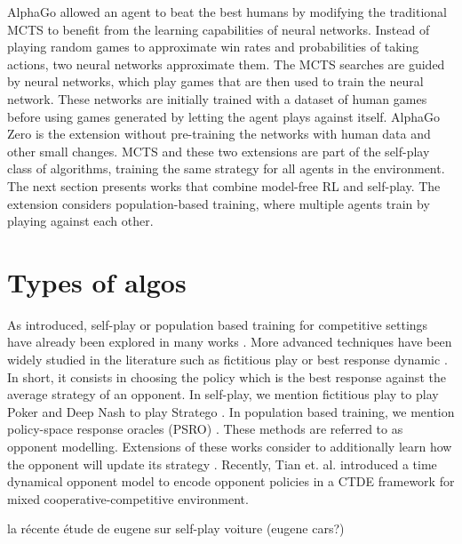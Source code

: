 AlphaGo \citep{silver2016mastering} allowed an agent to beat the best humans by modifying the traditional MCTS to benefit from the learning capabilities of neural networks.
Instead of playing random games to approximate win rates and probabilities of taking actions, two neural networks approximate them.
The MCTS searches are guided by neural networks, which play games that are then used to train the neural network.
These networks are initially trained with a dataset of human games before using games generated by letting the agent plays against itself.
AlphaGo Zero \citep{silver2017mastering} is the extension without pre-training the networks with human data and other small changes.
MCTS and these two extensions are part of the self-play class of algorithms, training the same strategy for all agents in the environment.
The next section presents works that combine model-free RL and self-play.
The extension considers population-based training, where multiple agents train by playing against each other.

\section{Types of algos}\label{sec:ch6_algo}

As introduced, self-play or population based training for competitive settings have already been explored in many works \citep{jaderberg2019human, vinyals2019grandmaster, baker2019emergent}.
More advanced techniques have been widely studied in the literature such as fictitious play \cite{brown1951iterative} or best response dynamic \citep{baudin2022fictitious}.
In short, it consists in choosing the policy which is the best response against the average strategy of an opponent.
In self-play, we mention fictitious play to play Poker \citep{pmlr-v37-heinrich15} and Deep Nash to play Stratego \citep{DM_stratego}.
In population based training, we mention policy-space response oracles (PSRO) \citep{NIPS2017_3323fe11, Muller2020A}.
These methods are referred to as opponent modelling.
Extensions of these works consider to additionally learn how the opponent will update its strategy \citep{he2016opponent, foerster2017learning}.
Recently, Tian et. al. \citep{tian2022multi} introduced a time dynamical opponent model to encode opponent policies in a CTDE framework for mixed cooperative-competitive environment.

la récente étude de eugene sur self-play voiture (eugene cars?)
